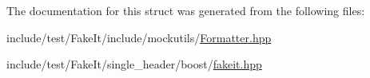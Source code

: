The documentation for this struct was generated from the following files\+:\begin{DoxyCompactItemize}
\item 
include/test/\+Fake\+It/include/mockutils/\mbox{\hyperlink{Formatter_8hpp}{Formatter.\+hpp}}\item 
include/test/\+Fake\+It/single\+\_\+header/boost/\mbox{\hyperlink{single__header_2boost_2fakeit_8hpp}{fakeit.\+hpp}}\end{DoxyCompactItemize}
